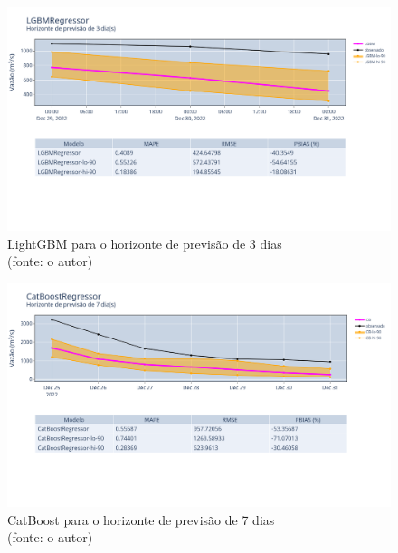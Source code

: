 \begin{figure}[!h]
	\centering
	\includegraphics[scale=0.33]{Figuras/jequiti/resultados/LGBMRegressor_fh3.png}
	\caption{LightGBM para o horizonte de previsão de 3 dias\\(fonte: o autor)}
	\label{fig:jequiti_LGBMRegressor_fh3}
\end{figure}

\begin{figure}[!h]
	\centering
	\includegraphics[scale=0.33]{Figuras/jequiti/resultados/CatBoostRegressor_fh7.png}
	\caption{CatBoost para o horizonte de previsão de 7 dias\\(fonte: o autor)}
	\label{fig:jequiti_CatBoostRegressor_fh7}
\end{figure}

